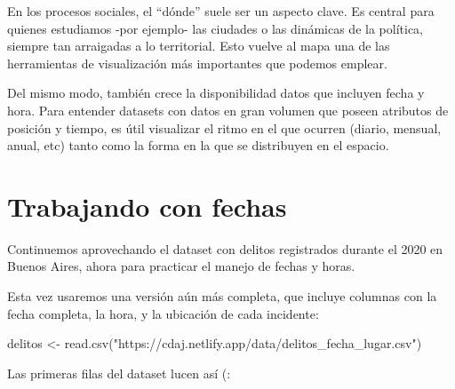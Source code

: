 \documentclass[
]{book}
\newenvironment{Shaded}{\begin{snugshade}}{\end{snugshade}}
\newcommand{\FunctionTok}[1]{\textcolor[rgb]{0.00,0.00,0.00}{#1}}
\newcommand{\NormalTok}[1]{#1}
\newcommand{\OtherTok}[1]{\textcolor[rgb]{0.56,0.35,0.01}{#1}}
\newcommand{\StringTok}[1]{\textcolor[rgb]{0.31,0.60,0.02}{#1}}
\begin{document}
En los procesos sociales, el ``dónde'' suele ser un aspecto clave. Es central para quienes estudiamos -por ejemplo- las ciudades o las dinámicas de la política, siempre tan arraigadas a lo territorial. Esto vuelve al mapa una de las herramientas de visualización más importantes que podemos emplear.

Del mismo modo, también crece la disponibilidad datos que incluyen fecha y hora. Para entender datasets con datos en gran volumen que poseen atributos de posición y tiempo, es útil visualizar el ritmo en el que ocurren (diario, mensual, anual, etc) tanto como la forma en la que se distribuyen en el espacio.

\hypertarget{trabajando-con-fechas}{%
\section{Trabajando con fechas}\label{trabajando-con-fechas}}

Continuemos aprovechando el dataset con delitos registrados durante el 2020 en Buenos Aires, ahora para practicar el manejo de fechas y horas.

Esta vez usaremos una versión aún más completa, que incluye columnas con la fecha completa, la hora, y la ubicación de cada incidente:

\begin{Shaded}
\begin{Highlighting}[]
\NormalTok{delitos }\OtherTok{\textless{}{-}} \FunctionTok{read.csv}\NormalTok{(}\StringTok{"https://cdaj.netlify.app/data/delitos\_fecha\_lugar.csv"}\NormalTok{)}
\end{Highlighting}
\end{Shaded}

Las primeras filas del dataset lucen así (:
\end{document}
